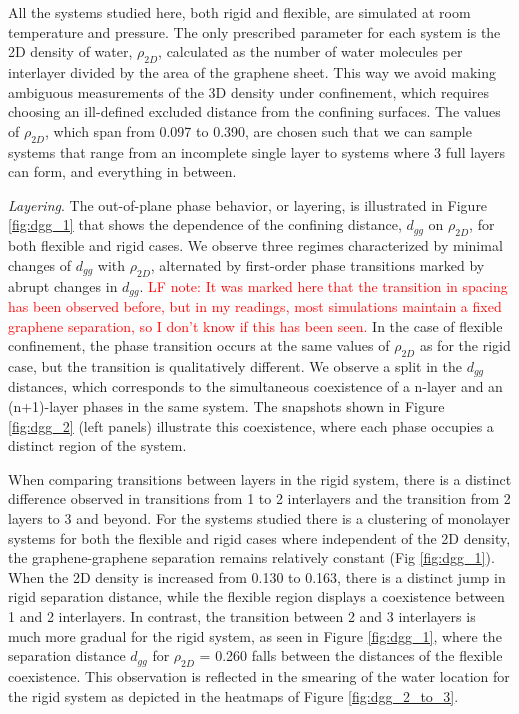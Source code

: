 \documentclass[12pt]{article}
\begin{document}
All the systems studied here, both rigid and flexible, are simulated at room temperature and pressure. The only prescribed parameter for each system is the 2D density of water, \(\rho_{2D}\), calculated as the number of water molecules per interlayer divided by the area of the graphene sheet. This way we avoid making ambiguous measurements of the 3D density under confinement, which requires choosing an ill-defined excluded distance from the confining surfaces. The values of \(\rho_{2D}\), which span from 0.097 to 0.390, are chosen such that we can sample systems that range from an incomplete single layer to systems where 3 full layers can form, and everything in between.

\textit{Layering}. The out-of-plane phase behavior, or layering, is illustrated in Figure \ref{fig:dgg_1} that shows the dependence of the confining distance, \(d_{gg}\) on \(\rho_{2D}\), for both flexible and rigid cases. We observe three regimes characterized by minimal changes of \(d_{gg}\) with \(\rho_{2D}\), alternated by first-order phase transitions marked by abrupt changes in \(d_{gg}\). \textcolor{red}{LF note: It was marked here that the transition in spacing has been observed before, but in my readings, most simulations maintain a fixed graphene separation, so I don't know if this has been seen.} In the case of flexible confinement, the phase transition occurs at the same values of \(\rho_{2D}\) as for the rigid case, but the transition is qualitatively different. We observe a split in the \(d_{gg}\) distances, which corresponds to the simultaneous coexistence of a n-layer and an (n+1)-layer phases in the same system. The snapshots shown in Figure \ref{fig:dgg_2} (left panels) illustrate this coexistence, where each phase occupies a distinct region of the system.

When comparing transitions between layers in the rigid system, there is a distinct difference observed in transitions from 1 to 2 interlayers and the transition from 2 layers to 3 and beyond. For the systems studied there is a clustering of monolayer systems for both the flexible and rigid cases where independent of the 2D density, the graphene-graphene separation remains relatively constant (Fig \ref{fig:dgg_1}). When the 2D density is increased from 0.130 to 0.163, there is a distinct jump in rigid separation distance, while the flexible region displays a coexistence between 1 and 2 interlayers. In contrast, the transition between 2 and 3 interlayers is much more gradual for the rigid system, as seen in Figure \ref{fig:dgg_1}, where the separation distance \(d_{gg}\) for \(\rho_{2D}\) = 0.260 falls between the distances of the flexible coexistence. This observation is reflected in the smearing of the water location for the rigid system as depicted in the heatmaps of Figure \ref{fig:dgg_2_to_3}.
\end{document}
